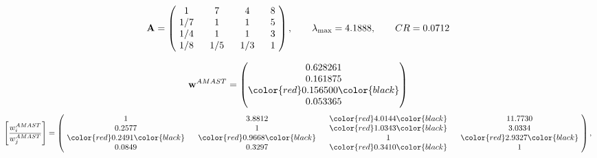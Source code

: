 \begin{example}
\begin{equation*}
\mathbf{A} =
\begin{pmatrix}
$\,\,$ 1 $\,\,$ & $\,\,$7$\,\,$ & $\,\,$4$\,\,$ & $\,\,$8 $\,\,$ \\
$\,\,$ 1/7$\,\,$ & $\,\,$ 1 $\,\,$ & $\,\,$1$\,\,$ & $\,\,$5 $\,\,$ \\
$\,\,$ 1/4$\,\,$ & $\,\,$ 1 $\,\,$ & $\,\,$ 1 $\,\,$ & $\,\,$3 $\,\,$ \\
$\,\,$ 1/8$\,\,$ & $\,\,$ 1/5$\,\,$ & $\,\,$ 1/3$\,\,$ & $\,\,$ 1  $\,\,$ \\
\end{pmatrix},
\qquad
\lambda_{\max} =
4.1888,
\qquad
CR = 0.0712
\end{equation*}

\begin{equation*}
\mathbf{w}^{AMAST} =
\begin{pmatrix}
0.628261\\
0.161875\\
\color{red} 0.156500\color{black} \\
0.053365
\end{pmatrix}\end{equation*}
\begin{equation*}
\left[ \frac{{w}^{AMAST}_i}{{w}^{AMAST}_j} \right] =
\begin{pmatrix}
$\,\,$ 1 $\,\,$ & $\,\,$3.8812$\,\,$ & $\,\,$\color{red} 4.0144\color{black} $\,\,$ & $\,\,$11.7730$\,\,$ \\
$\,\,$0.2577$\,\,$ & $\,\,$ 1 $\,\,$ & $\,\,$\color{red} 1.0343\color{black} $\,\,$ & $\,\,$3.0334  $\,\,$ \\
$\,\,$\color{red} 0.2491\color{black} $\,\,$ & $\,\,$\color{red} 0.9668\color{black} $\,\,$ & $\,\,$ 1 $\,\,$ & $\,\,$\color{red} 2.9327\color{black}  $\,\,$ \\
$\,\,$0.0849$\,\,$ & $\,\,$0.3297$\,\,$ & $\,\,$\color{red} 0.3410\color{black} $\,\,$ & $\,\,$ 1  $\,\,$ \\
\end{pmatrix},
\end{equation*}


\end{example}
